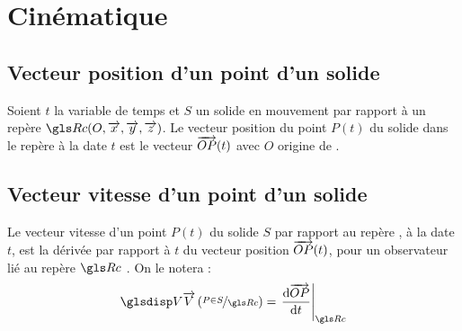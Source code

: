 \chapter{Cinématique}
	\section{Vecteur position d'un point d'un solide}
	\begin{definition}
	Soient $t$ la variable de temps et $S$ un solide en mouvement par rapport à un repère $\Rc(O,\vect{x},\vect{y},\vect{z})$. Le vecteur position du point $P(t)$ du solide dans le repère \Rc{} à la date $t$ est le vecteur $\overrightarrow{OP}(t)$ avec $O$ origine de \Rc{}.
	\end{definition}
	
	\section{Vecteur vitesse d'un point d'un solide}
	\begin{definition}
		Le vecteur vitesse d'un point $P(t)$ du solide $S$ par rapport au repère \Rc{}, à la date $t$, est la dérivée par rapport à $t$ du vecteur position $\overrightarrow{OP}(t)$, pour un observateur lié au repère $\Rc$ . On le notera :
		\begin{equation}
			\V[\Rc]{P}{S}=\diff[\Rc{}]{\vect{OP}}
		\end{equation}
	\end{definition}
	
